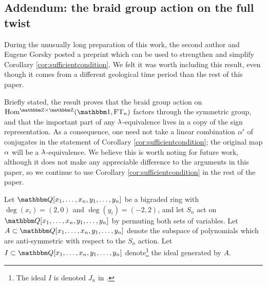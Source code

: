\subsection{Addendum: the braid group action on the full twist}
\label{subsec:symgrp}

During the unusually long preparation of this work, the second author and Eugene Gorsky posted a preprint \cite{GorHog17} which can be used to strengthen and simplify Corollary \ref{cor:sufficientcondition}. We felt it was worth including this result, even though it comes from a different geological time period than the rest of this paper.

Briefly stated, the result proves that the braid group action on $\Homgg(\one,\FT_n)$ factors through the symmetric group, and that the important part of any $\lambda$-equivalence lives in a copy of the sign representation. As a consequence, one need not take a linear combination $\alpha'$ of conjugates in the statement of Corollary \ref{cor:sufficientcondition}; the original map $\alpha$ will be a $\lambda$-equivalence. We believe this is worth noting for future work, although it does not make any appreciable difference to the arguments in this paper, so we continue to use Corollary \ref{cor:sufficientcondition} in the rest of the paper.


\begin{definition}
Let $\Q[x_1,\ldots,x_n,y_1,\ldots,y_n]$ be a bigraded ring with $\deg(x_i) = (2,0)$ and $\deg(y_i)=(-2,2)$, and let $S_n$ act on $\Q[x_1,\ldots,x_n,y_1,\ldots,y_n]$ by permuting both sets of variables. Let $A\subset \Q[x_1,\ldots,x_n,y_1,\ldots,y_n]$ denote the subspace of polynomials which are anti-symmetric with respect to the $S_n$ action.  Let $I\subset \Q[x_1,\ldots,x_n,y_1,\ldots,y_n]$ denote\footnote{The ideal $I$ is denoted $J_n$ in \cite{GorHog17}.} the ideal generated by $A$.
\end{definition}

